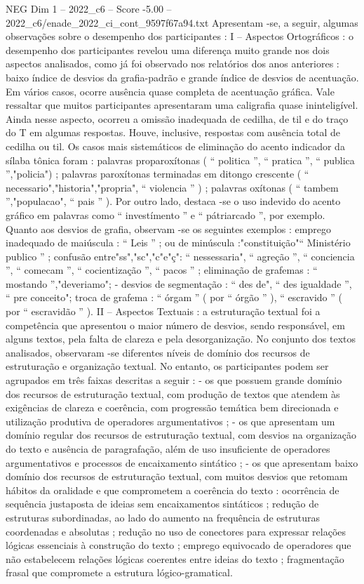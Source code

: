 \begin{textsample}{NEG Dim 1 – 2022\_c6 – Score -5.00 – 2022\_c6/enade\_2022\_ci\_cont\_9597f67a94.txt}
Apresentam -se, a seguir, algumas observações sobre o desempenho dos participantes : I – Aspectos Ortográficos : o desempenho dos participantes revelou uma diferença muito grande nos dois aspectos analisados, como já foi observado nos relatórios dos anos anteriores : baixo índice de desvios da grafia-padrão e grande índice de desvios de acentuação.
Em vários casos, ocorre ausência quase completa de acentuação gráfica.
Vale ressaltar que muitos participantes apresentaram uma caligrafia quase ininteligível.
Ainda nesse aspecto, ocorreu a omissão inadequada de cedilha, de til e do traço do T em algumas respostas.
Houve, inclusive, respostas com ausência total de cedilha ou til.
Os casos mais sistemáticos de eliminação do acento indicador da sílaba tônica foram : palavras proparoxítonas ( “ politica ”, “ pratica ”, “ publica ”,"policia") ; palavras paroxítonas terminadas em ditongo crescente ( “ necessario","historia","propria", “ violencia ” ) ; palavras oxítonas ( “ tambem ”,"populacao", “ pais ” ).
Por outro lado, destaca -se o uso indevido do acento gráfico em palavras como “ investímento ” e “ pátriarcado ”, por exemplo.
Quanto aos desvios de grafia, observam -se os seguintes exemplos : emprego inadequado de maiúscula : “ Leis ” ; ou de minúscula :"constituição"“ Ministério publico ” ; confusão entre"ss","sc","c"e"ç": “ nessessaria", “ agreção ”, “ conciencia ”, “ comecam ”, “ cocientização ”, “ pacos ” ; eliminação de grafemas : “ mostando ”,"deveriamo"; - desvios de segmentação : “ des de", “ des igualdade ”, “ pre conceito"; troca de grafema : “ órgam ” ( por “ órgão ” ), “ escravido ” ( por “ escravidão ” ).
II – Aspectos Textuais : a estruturação textual foi a competência que apresentou o maior número de desvios, sendo responsável, em alguns textos, pela falta de clareza e pela desorganização.
No conjunto dos textos analisados, observaram -se diferentes níveis de domínio dos recursos de estruturação e organização textual.
No entanto, os participantes podem ser agrupados em três faixas descritas a seguir : - os que possuem grande domínio dos recursos de estruturação textual, com produção de textos que atendem às exigências de clareza e coerência, com progressão temática bem direcionada e utilização produtiva de operadores argumentativos ; - os que apresentam um domínio regular dos recursos de estruturação textual, com desvios na organização do texto e ausência de paragrafação, além de uso insuficiente de operadores argumentativos e processos de encaixamento sintático ; - os que apresentam baixo domínio dos recursos de estruturação textual, com muitos desvios que retomam hábitos da oralidade e que comprometem a coerência do texto : ocorrência de sequência justaposta de ideias sem encaixamentos sintáticos ; redução de estruturas subordinadas, ao lado do aumento na frequência de estruturas coordenadas e absolutas ; redução no uso de conectores para expressar relações lógicas essenciais à construção do texto ; emprego equivocado de operadores que não estabelecem relações lógicas coerentes entre ideias do texto ; fragmentação frasal que compromete a estrutura lógico-gramatical.

\end{textsample}
